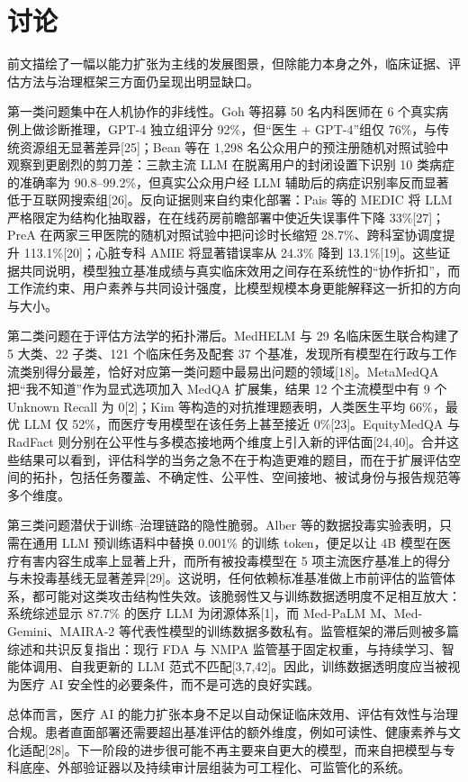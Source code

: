 \section{讨论}

前文描绘了一幅以能力扩张为主线的发展图景，但除能力本身之外，临床证据、评估方法与治理框架三方面仍呈现出明显缺口。

第一类问题集中在人机协作的非线性。Goh 等招募 50 名内科医师在 6 个真实病例上做诊断推理，GPT-4 独立组评分 92\%，但“医生 + GPT-4”组仅 76\%，与传统资源组无显著差异[25]；Bean 等在 1,298 名公众用户的预注册随机对照试验中观察到更剧烈的剪刀差：三款主流 LLM 在脱离用户的封闭设置下识别 10 类病症的准确率为 90.8--99.2\%，但真实公众用户经 LLM 辅助后的病症识别率反而显著低于互联网搜索组[26]。反向证据则来自约束化部署：Pais 等的 MEDIC 将 LLM 严格限定为结构化抽取器，在在线药房前瞻部署中使近失误事件下降 33\%[27]；PreA 在两家三甲医院的随机对照试验中把问诊时长缩短 28.7\%、跨科室协调度提升 113.1\%[20]；心脏专科 AMIE 将显著错误率从 24.3\% 降到 13.1\%[19]。这些证据共同说明，模型独立基准成绩与真实临床效用之间存在系统性的“协作折扣”，而工作流约束、用户素养与共同设计强度，比模型规模本身更能解释这一折扣的方向与大小。

第二类问题在于评估方法学的拓扑滞后。MedHELM 与 29 名临床医生联合构建了 5 大类、22 子类、121 个临床任务及配套 37 个基准，发现所有模型在行政与工作流类别得分最差，恰好对应第一类问题中最易出问题的领域[18]。MetaMedQA 把“我不知道”作为显式选项加入 MedQA 扩展集，结果 12 个主流模型中有 9 个 Unknown Recall 为 0[2]；Kim 等构造的对抗推理题表明，人类医生平均 66\%，最优 LLM 仅 52\%，而医疗专用模型在该任务上甚至接近 0\%[23]。EquityMedQA 与 RadFact 则分别在公平性与多模态接地两个维度上引入新的评估面[24,40]。合并这些结果可以看到，评估科学的当务之急不在于构造更难的题目，而在于扩展评估空间的拓扑，包括任务覆盖、不确定性、公平性、空间接地、被试身份与报告规范等多个维度。

第三类问题潜伏于训练--治理链路的隐性脆弱。Alber 等的数据投毒实验表明，只需在通用 LLM 预训练语料中替换 0.001\% 的训练 token，便足以让 4B 模型在医疗有害内容生成率上显著上升，而所有被投毒模型在 5 项主流医疗基准上的得分与未投毒基线无显著差异[29]。这说明，任何依赖标准基准做上市前评估的监管体系，都可能对这类攻击结构性失效。该脆弱性又与训练数据透明度不足相互放大：系统综述显示 87.7\% 的医疗 LLM 为闭源体系[1]，而 Med-PaLM M、Med-Gemini、MAIRA-2 等代表性模型的训练数据多数私有。监管框架的滞后则被多篇综述和共识反复指出：现行 FDA 与 NMPA 监管基于固定权重，与持续学习、智能体调用、自我更新的 LLM 范式不匹配[3,7,42]。因此，训练数据透明度应当被视为医疗 AI 安全性的必要条件，而不是可选的良好实践。

总体而言，医疗 AI 的能力扩张本身不足以自动保证临床效用、评估有效性与治理合规。患者直面部署还需要超出基准评估的额外维度，例如可读性、健康素养与文化适配[28]。下一阶段的进步很可能不再主要来自更大的模型，而来自把模型与专科底座、外部验证器以及持续审计层组装为可工程化、可监管化的系统。

